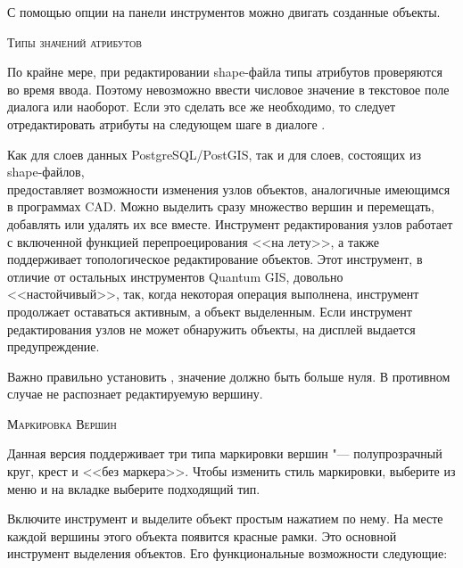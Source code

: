С помощью опции  на
панели инструментов можно двигать созданные объекты.

\begin{Tip}\caption{\textsc{Типы значений атрибутов}}
По крайне мере, при редактировании shape-файла типы атрибутов проверяются
во время ввода. Поэтому невозможно ввести числовое значение в текстовое поле
диалога  или наоборот. Если это сделать все же необходимо,
то следует отредактировать атрибуты на следующем шаге в диалоге
.
\end{Tip}


Как для слоев данных PostgreSQL/PostGIS, так и для слоев, состоящих из
shape-файлов, \\
 предоставляет
возможности изменения узлов объектов, аналогичные имеющимся в программах CAD.
Можно выделить сразу множество вершин и перемещать, добавлять или удалять
их все вместе. Инструмент редактирования узлов работает с включенной функцией
перепроецирования <<на лету>>, а также поддерживает топологическое редактирование
объектов. Этот инструмент, в отличие от остальных инструментов Quantum GIS,
довольно <<настойчивый>>, так, когда некоторая операция выполнена, инструмент
продолжает оставаться активным, а объект выделенным. Если инструмент
редактирования узлов не может обнаружить объекты, на дисплей выдается
предупреждение.

Важно правильно установить  \arrow
{} \arrow
{} \arrow {}, значение должно быть
больше нуля. В противном случае \qg не распознает редактируемую вершину.

\begin{Tip}\caption{\textsc{Маркировка Вершин}}
Данная версия \qg поддерживает три типа маркировки вершин "--- полупрозрачный
круг, крест и <<без маркера>>. Чтобы изменить стиль маркировки, выберите
 из меню 
и на вкладке  выберите подходящий тип.
\end{Tip}


Включите инструмент  и
выделите объект простым нажатием по нему. На месте каждой вершины этого
объекта появится красные рамки. Это основной инструмент выделения объектов.
Его функциональные возможности следующие:

